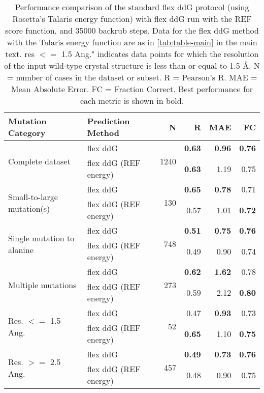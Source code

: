 \begin{table}
  \begin{tabular}{llrrrr}
\toprule
Mutation Category &      Prediction Method &     N &    R &  MAE &   FC \\
\midrule
 \multirow{ 2}{*}{Complete dataset} & flex ddG & \multirow{ 2}{*}{1240} & \textbf{0.63} & \textbf{0.96} & \textbf{0.76}  \\
 & flex ddG (REF energy) & & \textbf{0.63} & 1.19 & 0.75  \\
\hline
 \multirow{ 2}{*}{Small-to-large mutation(s)} & flex ddG & \multirow{ 2}{*}{130} & \textbf{0.65} & \textbf{0.78} & 0.71  \\
 & flex ddG (REF energy) & & 0.57 & 1.01 & \textbf{0.72}  \\
\hline
 \multirow{ 2}{*}{Single mutation to alanine} & flex ddG & \multirow{ 2}{*}{748} & \textbf{0.51} & \textbf{0.75} & \textbf{0.76}  \\
 & flex ddG (REF energy) & & 0.49 & 0.90 & 0.74  \\
\hline
 \multirow{ 2}{*}{Multiple mutations} & flex ddG & \multirow{ 2}{*}{273} & \textbf{0.62} & \textbf{1.62} & 0.78  \\
 & flex ddG (REF energy) & & 0.59 & 2.12 & \textbf{0.80}  \\
\hline
 \multirow{ 2}{*}{Res. $<=$ 1.5 Ang.} & flex ddG & \multirow{ 2}{*}{52} & 0.47 & \textbf{0.93} & 0.73  \\
 & flex ddG (REF energy) & & \textbf{0.65} & 1.10 & \textbf{0.75}  \\
\hline
 \multirow{ 2}{*}{Res. $>=$ 2.5 Ang.} & flex ddG & \multirow{ 2}{*}{457} & \textbf{0.49} & \textbf{0.73} & \textbf{0.76}  \\
 & flex ddG (REF energy) & & 0.48 & 0.90 & 0.75  \\
\bottomrule
\end{tabular}
  \caption[REF results]{
    Performance comparison of the standard flex ddG protocol (using Rosetta's Talaris energy function) with flex ddG run with the REF score function, and 35000 backrub steps. Data for the flex ddG method with the Talaris energy function are as in \cref{tab:table-main} in the main text. res $<=$ 1.5 Ang." indicates data points for which the resolution of the input wild-type crystal structure is less than or equal to 1.5 \AA. N = number of cases in the dataset or subset. R = Pearson's R. MAE = Mean Absolute Error. FC = Fraction Correct. Best performance for each metric is shown in bold.
  } \label{tab:table-ref}
\end{table}
